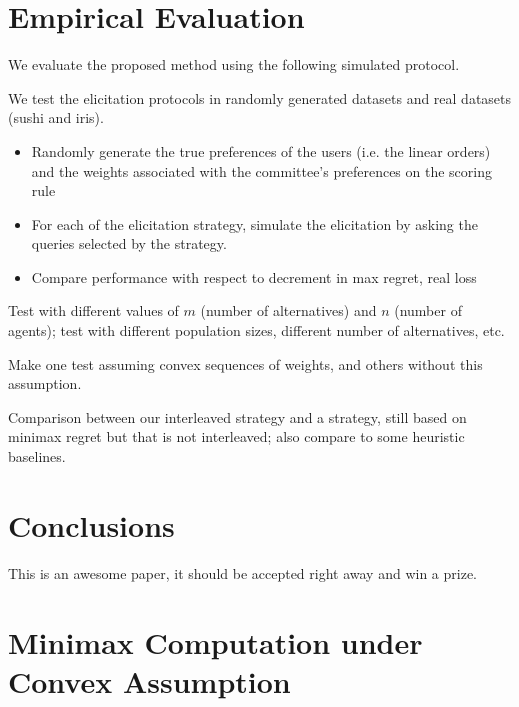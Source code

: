 \documentclass[12pt]{article}
\begin{document}
\section{Empirical Evaluation} \label{sec:experiments}

We evaluate the proposed method using the following simulated protocol.

We test the elicitation protocols in randomly generated datasets and real datasets (sushi and iris).

\begin{itemize}
 \item Randomly generate the true preferences of the users (i.e. the linear orders) and the weights associated with the committee's preferences on the scoring rule
 \item For each of the elicitation strategy, simulate the elicitation by asking the queries selected by the strategy.
 
 \item Compare performance with respect to decrement in max regret, real loss
\end{itemize}

Test with different values of $m$ (number of alternatives) and $n$ (number of agents); test with different population sizes, different number of alternatives, etc.

Make one test assuming convex sequences of weights, and others without this assumption.

Comparison between our interleaved strategy and a strategy, still based on minimax regret  but that is not interleaved; also compare to some heuristic baselines.

\section{Conclusions}  \label{sec:conclusions}

This is an awesome paper, it should be accepted right away and win a prize.


 

\pagebreak
\appendix
\section{Minimax Computation under Convex Assumption} 
\end{document}
